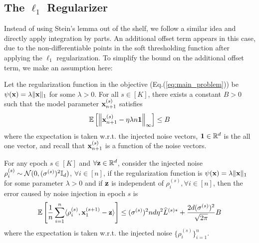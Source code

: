 \subsection{The $\ell_1$ Regularizer}
\label{subsec:appendix_l1_reg}

Instead of using Stein's lemma out of the shelf, we follow a similar idea and directly apply integration by parts. An additional offset term appears in this case, due to the non-differentiable points in the soft thresholding function after applying the $\ell_1$ regularization. To simplify the bound on the additional offset term, we make an assumption here:
\begin{assumption}
\label{ass:l1_offset}
    Let the regularization function in the objective (Eq.(\ref{eq:main_problem})) be $\psi({\mathbf{x}}) = \lambda \|{\mathbf{x}}\|_1$ for some $\lambda > 0$.
    For all $s\in [K]$, there exists a constant $B > 0$ such that the model parameter ${\mathbf{x}}_{n+1}^{(s)}$ satisfies
    \begin{align}
        \mathbb{E}\left[ \left\| {\mathbf{x}}_{n+1}^{(s)} - \eta \lambda n \mathbf{1} \right\|_{\infty}\right] \leq B
    \end{align}
    where the expectation is taken w.r.t. the injected noise vectors, $\mathbf{1} \in \mathbb{R}^d$ is the all one vector, and recall that ${\mathbf{x}}_{n+1}^{(s)}$ is a function of the noise vectors. 
\end{assumption}

\begin{lemma}
\label{lemma:noise_bias_l1_reg}
    For any epoch $s\in [K]$ and $\forall {\mathbf{z}} \in \mathbb{R}^{d}$, consider the injected noise $\rho_{i}^{(s)} \sim {\mathcal{N}}(0, (\sigma^{(s)})^2 {\mathbb{I}}_d)$, $\forall i\in [n]$, if the regularization function is $\psi({\mathbf{x}}) = \lambda \|{\mathbf{x}}\|_1$ for some parameter $\lambda > 0$ and if ${\mathbf{z}}$ is independent of $\rho_i^{(s)}, \forall i\in [n]$, then the error caused by noise injection in epoch $s$ is
    \begin{align}
        \mathbb{E}\left[\frac{1}{n}\sum_{i=1}^{n} \langle \rho_i^{(s)}, {\mathbf{x}}_1^{(s+1)} - {\mathbf{z}} \rangle \right] 
        \leq (\sigma^{(s)})^2 nd \eta^2 \widehat{L}^{(s)*}
        + \frac{2 d(\sigma^{(s)})^2}{\sqrt{2\pi}} B
    \end{align}
    where the expectation is taken w.r.t. the injected noise $\{\rho_i^{(s)}\}_{i=1}^{n}$.
\end{lemma}

